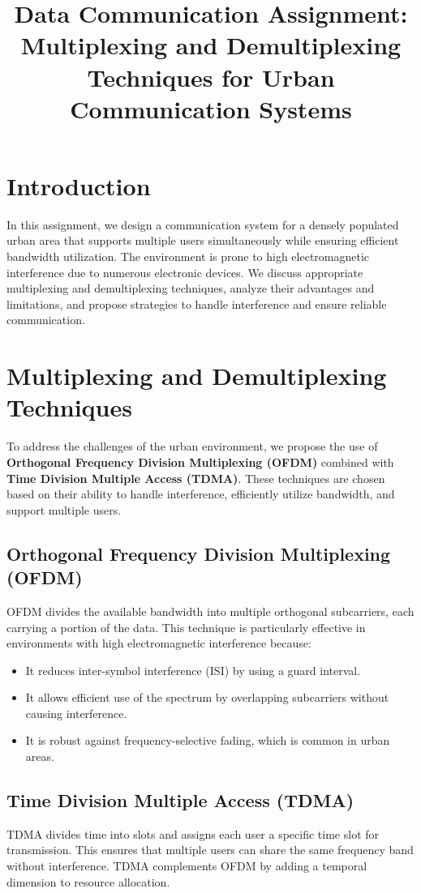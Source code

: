 \documentclass[12pt]{article}
\title{Data Communication Assignment: Multiplexing and Demultiplexing Techniques for Urban Communication Systems}
\author{}
\date{}
\begin{document}
\maketitle

\section*{Introduction}
In this assignment, we design a communication system for a densely populated urban area that supports multiple users simultaneously while ensuring efficient bandwidth utilization. The environment is prone to high electromagnetic interference due to numerous electronic devices. We discuss appropriate multiplexing and demultiplexing techniques, analyze their advantages and limitations, and propose strategies to handle interference and ensure reliable communication.

\section*{Multiplexing and Demultiplexing Techniques}
To address the challenges of the urban environment, we propose the use of \textbf{Orthogonal Frequency Division Multiplexing (OFDM)} combined with \textbf{Time Division Multiple Access (TDMA)}. These techniques are chosen based on their ability to handle interference, efficiently utilize bandwidth, and support multiple users.

\subsection*{Orthogonal Frequency Division Multiplexing (OFDM)}
OFDM divides the available bandwidth into multiple orthogonal subcarriers, each carrying a portion of the data. This technique is particularly effective in environments with high electromagnetic interference because:
\begin{itemize}
    \item It reduces inter-symbol interference (ISI) by using a guard interval.
    \item It allows efficient use of the spectrum by overlapping subcarriers without causing interference.
    \item It is robust against frequency-selective fading, which is common in urban areas.
\end{itemize}

\subsection*{Time Division Multiple Access (TDMA)}
TDMA divides time into slots and assigns each user a specific time slot for transmission. This ensures that multiple users can share the same frequency band without interference. TDMA complements OFDM by adding a temporal dimension to resource allocation.
\end{document}
